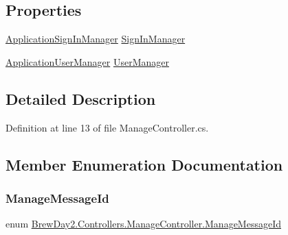 \subsection*{Properties}
\begin{DoxyCompactItemize}
\item 
\mbox{\hyperlink{class_brew_day2_1_1_application_sign_in_manager}{Application\+Sign\+In\+Manager}} \mbox{\hyperlink{class_brew_day2_1_1_controllers_1_1_manage_controller_a0e906cea9b7776c78efc7b35118b90a6}{Sign\+In\+Manager}}
\item 
\mbox{\hyperlink{class_brew_day2_1_1_application_user_manager}{Application\+User\+Manager}} \mbox{\hyperlink{class_brew_day2_1_1_controllers_1_1_manage_controller_a5a0dffe800a4f3f2f630d19508965e92}{User\+Manager}}
\end{DoxyCompactItemize}


\subsection{Detailed Description}


Definition at line 13 of file Manage\+Controller.\+cs.



\subsection{Member Enumeration Documentation}
\mbox{\label{class_brew_day2_1_1_controllers_1_1_manage_controller_a418038dc90e9d94606f474b9c06fd8c8}} 
\subsubsection{\texorpdfstring{Manage\+Message\+Id}{ManageMessageId}}
{\footnotesize\ttfamily enum \mbox{\hyperlink{class_brew_day2_1_1_controllers_1_1_manage_controller_a418038dc90e9d94606f474b9c06fd8c8}{Brew\+Day2.\+Controllers.\+Manage\+Controller.\+Manage\+Message\+Id}}\hspace{0.3cm}{\ttfamily [strong]}}

